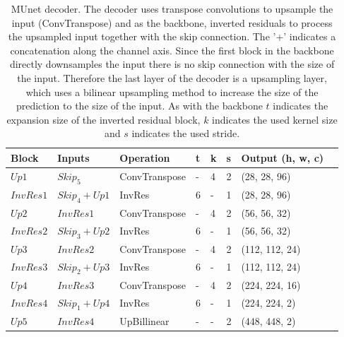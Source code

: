 \begin{table} %
\begin{center}

\begin{tabular}{l|l|l|l|l|l|l|l}
\textbf{Block} & \textbf{Inputs} & \textbf{Operation} & \textbf{t} & \textbf{k} & \textbf{s} & \textbf{Output (h, w, c)}\\
\hline
$Up1$     & $Skip_5$        & ConvTranspose & - & 4 & 2 & (28, 28, 96)   \\
$InvRes1$ & $Skip_4 + Up1$  & InvRes        & 6 & - & 1 & (28, 28, 96)   \\
$Up2$     & $InvRes1$       & ConvTranspose & - & 4 & 2 & (56, 56, 32)   \\
$InvRes2$ & $Skip_3 + Up2$  & InvRes        & 6 & - & 1 & (56, 56, 32)   \\
$Up3$     & $InvRes2$       & ConvTranspose & - & 4 & 2 & (112, 112, 24) \\
$InvRes3$ & $Skip_2 + Up3$  & InvRes        & 6 & - & 1 & (112, 112, 24) \\
$Up4$     & $InvRes3$       & ConvTranspose & - & 4 & 2 & (224, 224, 16) \\
$InvRes4$ & $Skip_1 + Up4$  & InvRes        & 6 & - & 1 & (224, 224, 2)  \\
$Up5$     & $InvRes4$       & UpBillinear   & - & - & 2 & (448, 448, 2)  \\
\end{tabular}

\caption{\ac{MUnet} decoder. The decoder uses transpose convolutions to upsample the input (ConvTranspose) and as the backbone, inverted residuals to process the upsampled input together with the skip connection. The '+' indicates a concatenation along the channel axis. Since the first block in the backbone directly downsamples the input there is no skip connection with the size of the input. Therefore the last layer of the decoder is a upsampling layer, which uses a bilinear upsampling method to increase the size of the prediction to the size of the input. As with the backbone $t$ indicates the expansion size of the inverted residual block, $k$ indicates the used kernel size and $s$ indicates the used stride.}
\label{tab:mobilenetv2_decoder}
\end{center}
\end{table}
